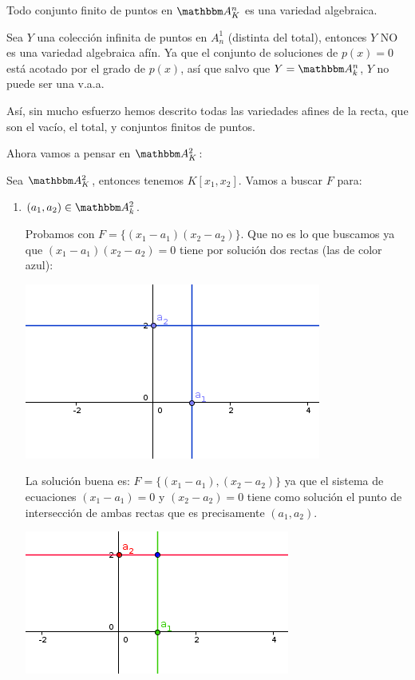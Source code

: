 \obs Todo conjunto finito de puntos en $\A_K^n$ es una variedad algebraica.

\obs Sea $Y$ una colección infinita de puntos en $A^1_n$ (distinta del total), entonces $Y$ NO es una variedad algebraica afín. Ya que el conjunto de soluciones de $p(x)=0$ está acotado por el grado de $p(x)$, así que salvo que $Y=\A^n_k$, $Y$ no puede ser una v.a.a.

Así, sin mucho esfuerzo hemos descrito todas las variedades afines de la recta, que son el vacío, el total, y conjuntos finitos de puntos.

Ahora vamos a pensar en  $\A_K^2$:
\begin{example}
	Sea $\A_K^2$, entonces tenemos $K[x_1,x_2]$. Vamos a buscar $F$ para:

	\begin{enumerate}
		\item $(a_1,a_2) \in \A^2_k$.

		Probamos con $F=\{(x_1-a_1)(x_2-a_2)\}$. Que no es lo que buscamos ya que $(x_1-a_1)(x_2-a_2)=0$ tiene por solución dos rectas (las de color azul):

		\begin{center}
			\includegraphics[scale=0.45]{img/ej1.png}
		\end{center}

		La solución buena es:  $F=\{(x_1-a_1),(x_2-a_2)\}$ ya que el sistema de ecuaciones $(x_1-a_1)=0$ y $(x_2-a_2)=0$ tiene como solución el punto de intersección de ambas rectas que es precisamente $(a_1,a_2)$.

		\begin{center}
			\includegraphics[scale=0.45]{img/ej2.png}
		\end{center}



\end{enumerate}
\end{example}
